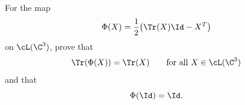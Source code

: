 For the map
$$
\Phi(X)=\frac{1}{2}\bigl(\Tr(X)\Id-X^T\bigr)
$$
on $\cL(\C^3)$, prove that
$$
\Tr(\Phi(X))=\Tr(X)
\qquad\text{for all }X\in\cL(\C^3)
$$
and that
$$
\Phi(\Id)=\Id.
$$
